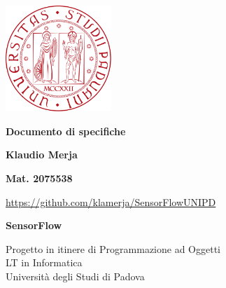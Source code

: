 \documentclass[a4paper, 12pt]{article}
\begin{document}
    \begin{titlepage}
        \begin{center}
            \includegraphics[width=0.3\textwidth]{./assets/LogoUNIPD.png}\\

            \vspace*{1cm}

            \Huge
            \textbf{Documento di specifiche}

            \vspace{1cm}

            \LARGE
            \textbf{Klaudio Merja}

            \vspace{0.2cm}

            \large
            \textbf{Mat. 2075538}

            \vspace{0.2cm}

            \url{https://github.com/klamerja/SensorFlowUNIPD}

            \tableofcontents
            \vfill

            \LARGE
            \textbf{SensorFlow}

            \normalsize
            \vspace{0.8cm}
            Progetto in itinere di Programmazione ad Oggetti\\
            LT in Informatica\\
            Università degli Studi di Padova
        \end{center}
    \end{titlepage}
\end{document}
